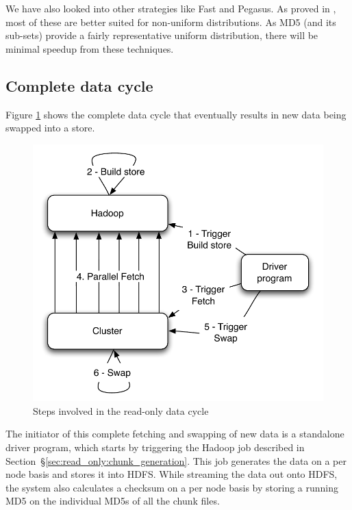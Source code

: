 We have also looked into other strategies like Fast and Pegasus. As
proved in \citet{manolopoulos}, most of these are better suited for
non-uniform distributions. As MD5 (and its sub-sets) provide a fairly
representative uniform distribution, there will be minimal speedup
from these techniques.


\subsection{Complete data cycle}
\label{sec:read_only:data_cycle}

Figure \ref{cycle} shows the complete data cycle that eventually
results in new data being swapped into a \projectname{} store. 

\begin{figure}
  \centering
    \includegraphics[scale=0.60]{images/cycle.pdf}
  \caption{Steps involved in the read-only data cycle}
  \label{cycle}
\end{figure}

The initiator of this complete fetching and swapping of new data is a
standalone driver program, which starts by triggering the Hadoop job
described in Section~\S\ref{sec:read_only:chunk_generation}. This job
generates the data on a per node basis and stores it into HDFS. While
streaming the data out onto HDFS, the system also calculates a
checksum on a per node basis by storing a running MD5 on the
individual MD5s of all the chunk files. 

